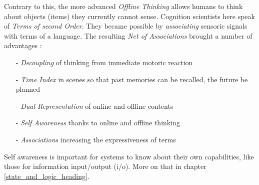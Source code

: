 Contrary to this, the more advanced \emph{Offline Thinking} \cite{jaeger}
allows humans to think about objects (items) they currently cannot sense.
Cognition scientists here speak of \emph{Terms of second Order}. They became
possible by \emph{associating} sensoric signals with terms of a language. The
resulting \emph{Net of Associations} brought a number of advantages
\cite{jaeger}:

\begin{itemize}
    \item[-] \emph{Decoupling} of thinking from immediate motoric reaction
    \item[-] \emph{Time Index} in scenes so that past memories can be recalled,
        the future be planned
    \item[-] \emph{Dual Representation} of online and offline contents
    \item[-] \emph{Self Awareness} thanks to online and offline thinking
    \item[-] \emph{Associations} increasing the expressiveness of terms
\end{itemize}

Self awareness is important for systems to know about their own capabilities,
like those for information input/output (i/o). More on that in chapter
\ref{state_and_logic_heading}.
